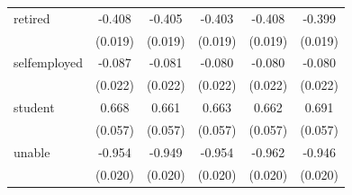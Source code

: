 \documentclass[11pt,a4paper,oldfontcommands]{memoir}
\begin{document}
{\begin{footnotesize}
\begin{tiny}
\begin{longtable}{l*{5}{c}}
retired             &      -0.408\sym{***}&      -0.405\sym{***}&      -0.403\sym{***}&      -0.408\sym{***}&      -0.399\sym{***}\\
                    &     (0.019)         &     (0.019)         &     (0.019)         &     (0.019)         &     (0.019)         \\
 
selfemployed        &      -0.087\sym{***}&      -0.081\sym{***}&      -0.080\sym{***}&      -0.080\sym{***}&      -0.080\sym{***}\\
                    &     (0.022)         &     (0.022)         &     (0.022)         &     (0.022)         &     (0.022)         \\
 
student             &       0.668\sym{***}&       0.661\sym{***}&       0.663\sym{***}&       0.662\sym{***}&       0.691\sym{***}\\
                    &     (0.057)         &     (0.057)         &     (0.057)         &     (0.057)         &     (0.057)         \\
 
unable              &      -0.954\sym{***}&      -0.949\sym{***}&      -0.954\sym{***}&      -0.962\sym{***}&      -0.946\sym{***}\\
                    &     (0.020)         &     (0.020)         &     (0.020)         &     (0.020)         &     (0.020)         \\
 

\end{longtable}
\end{tiny}
\end{footnotesize}}
\end{document}
